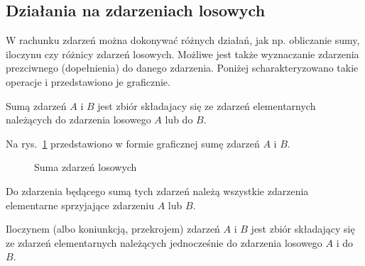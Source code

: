 \documentclass[
  letterpaper,
  DIV=11,
  numbers=noendperiod]{scrreprt}
\makeatletter
\newcommand*\pandocbounded[1]{%
  \sbox\pandoc@box{#1}%
  \Gscale@div\@tempa{\textheight}{\dimexpr\ht\pandoc@box+\dp\pandoc@box\relax}%
  \Gscale@div\@tempb{\linewidth}{\wd\pandoc@box}%
  \ifdim\@tempb\p@<\@tempa\p@\let\@tempa\@tempb\fi%
  \ifdim\@tempa\p@<\p@\scalebox{\@tempa}{\usebox\pandoc@box}%
  \else\usebox{\pandoc@box}%
  \fi%
}
\makeatother
\begin{document}
\subsection{Działania na zdarzeniach
losowych}\label{dziaux142ania-na-zdarzeniach-losowych}

W rachunku zdarzeń można dokonywać różnych działań, jak np. obliczanie
sumy, iloczynu czy różnicy zdarzeń losowych. Możliwe jest także
wyznaczanie zdarzenia prezciwnego (dopełnienia) do danego zdarzenia.
Poniżej scharakteryzowano takie operacje i przedstawiono je graficznie.

\begin{tcolorbox}[enhanced jigsaw, toprule=.15mm, title=\textcolor{quarto-callout-note-color}{\faInfo}\hspace{0.5em}{Suma zdarzeń \(A\) i \(B\)}, breakable, coltitle=black, titlerule=0mm, colbacktitle=quarto-callout-note-color!10!white, opacitybacktitle=0.6, opacityback=0, bottomtitle=1mm, left=2mm, arc=.35mm, leftrule=.75mm, bottomrule=.15mm, rightrule=.15mm, toptitle=1mm, colframe=quarto-callout-note-color-frame, colback=white]

Sumą zdarzeń \(A\) i \(B\) jest zbiór składajacy się ze zdarzeń
elementarnych należących do zdarzenia losowego \(A\) lub do \(B\).

\end{tcolorbox}

Na rys.~\ref{fig-suma} przedstawiono w formie graficznej sumę zdarzeń
\(A\) i \(B\).

\begin{figure}

\centering{

\pandocbounded{\texttt{[image: r03\_files/figure-pdf/fig-suma-1.pdf]}}

}

\caption{\label{fig-suma}Suma zdarzeń losowych}

\end{figure}%

Do zdarzenia będącego sumą tych zdarzeń należą wszystkie zdarzenia
elementarne sprzyjające zdarzeniu \(A\) lub \(B\).

\begin{tcolorbox}[enhanced jigsaw, toprule=.15mm, title=\textcolor{quarto-callout-note-color}{\faInfo}\hspace{0.5em}{Iloczyn zdarzeń \(A\) i \(B\)}, breakable, coltitle=black, titlerule=0mm, colbacktitle=quarto-callout-note-color!10!white, opacitybacktitle=0.6, opacityback=0, bottomtitle=1mm, left=2mm, arc=.35mm, leftrule=.75mm, bottomrule=.15mm, rightrule=.15mm, toptitle=1mm, colframe=quarto-callout-note-color-frame, colback=white]

Iloczynem (albo koniunkcją, przekrojem) zdarzeń \(A\) i \(B\) jest zbiór
składający się ze zdarzeń elementarnych należących jednocześnie do
zdarzenia losowego \(A\) i do \(B\).

\end{tcolorbox}
\end{document}
